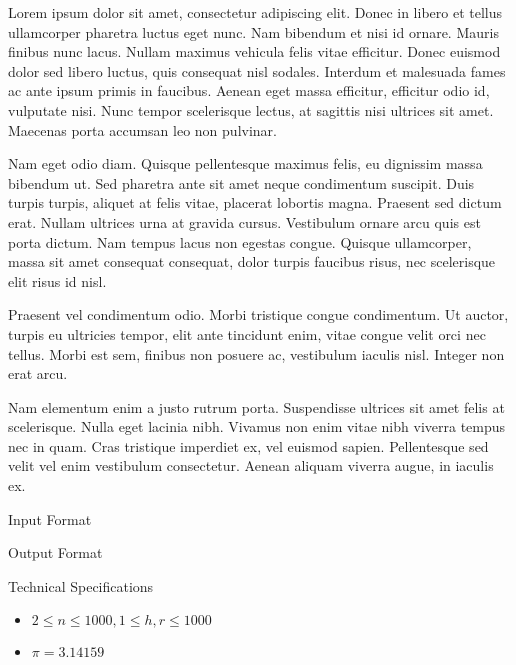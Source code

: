 \documentclass[12pt, a4paper, solution]{quiz}
\begin{document}
\hwtitle
Lorem ipsum dolor sit amet, consectetur adipiscing elit. Donec in libero et tellus ullamcorper pharetra luctus eget nunc. Nam bibendum et nisi id ornare. Mauris finibus nunc lacus. Nullam maximus vehicula felis vitae efficitur. Donec euismod dolor sed libero luctus, quis consequat nisl sodales. Interdum et malesuada fames ac ante ipsum primis in faucibus. Aenean eget massa efficitur, efficitur odio id, vulputate nisi. Nunc tempor scelerisque lectus, at sagittis nisi ultrices sit amet. Maecenas porta accumsan leo non pulvinar.

Nam eget odio diam. Quisque pellentesque maximus felis, eu dignissim massa bibendum ut. Sed pharetra ante sit amet neque condimentum suscipit. Duis turpis turpis, aliquet at felis vitae, placerat lobortis magna. Praesent sed dictum erat. Nullam ultrices urna at gravida cursus. Vestibulum ornare arcu quis est porta dictum. Nam tempus lacus non egestas congue. Quisque ullamcorper, massa sit amet consequat consequat, dolor turpis faucibus risus, nec scelerisque elit risus id nisl.

Praesent vel condimentum odio. Morbi tristique congue condimentum. Ut auctor, turpis eu ultricies tempor, elit ante tincidunt enim, vitae congue velit orci nec tellus. Morbi est sem, finibus non posuere ac, vestibulum iaculis nisl. Integer non erat arcu.

Nam elementum enim a justo rutrum porta. Suspendisse ultrices sit amet felis at scelerisque. Nulla eget lacinia nibh. Vivamus non enim vitae nibh viverra tempus nec in quam. Cras tristique imperdiet ex, vel euismod sapien. Pellentesque sed velit vel enim vestibulum consectetur. Aenean aliquam viverra augue, in iaculis ex.

\begin{myitemize}
\item Input Format\\
\item Output Format\\
\item Technical Specifications
\begin{itemize}
\item $2 \leq n \leq 1000, 1 \leq h, r \leq 1000$
\item $\pi = 3.14159$
\end{itemize}
\end{myitemize}
\begin{testcase}
\end{testcase}

\end{document}
